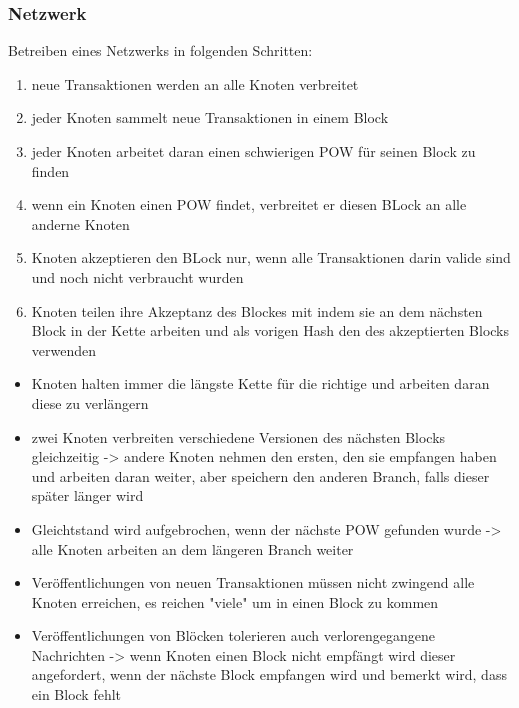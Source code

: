 \subsubsection*{Netzwerk}
    Betreiben eines Netzwerks in folgenden Schritten:
    \begin{enumerate}
        \item neue Transaktionen werden an alle Knoten verbreitet
        \item jeder Knoten sammelt neue Transaktionen in einem Block
        \item jeder Knoten arbeitet daran einen schwierigen POW für seinen Block zu finden
        \item wenn ein Knoten einen POW findet, verbreitet er diesen BLock an alle anderne Knoten
        \item Knoten akzeptieren den BLock nur, wenn alle Transaktionen darin valide sind und noch nicht verbraucht wurden
        \item Knoten teilen ihre Akzeptanz des Blockes mit indem sie an dem nächsten Block in der Kette arbeiten und als vorigen Hash den des akzeptierten Blocks verwenden
    \end{enumerate}
    \begin{itemize}
        \item Knoten halten immer die längste Kette für die richtige und arbeiten daran diese zu verlängern
        \item zwei Knoten verbreiten verschiedene Versionen des nächsten Blocks gleichzeitig -> andere Knoten nehmen den ersten, den sie empfangen haben und arbeiten daran weiter, aber speichern den anderen Branch, falls dieser später länger wird
        \item Gleichtstand wird aufgebrochen, wenn der nächste POW gefunden wurde -> alle Knoten arbeiten an dem längeren Branch weiter
        \item Veröffentlichungen von neuen Transaktionen müssen nicht zwingend alle Knoten erreichen, es reichen "viele" um in einen Block zu kommen
        \item Veröffentlichungen von Blöcken tolerieren auch verlorengegangene Nachrichten -> wenn Knoten einen Block nicht empfängt wird dieser angefordert, wenn der nächste Block empfangen wird und bemerkt wird, dass ein Block fehlt
    \end{itemize}

